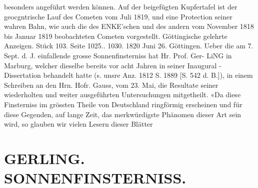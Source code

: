 \documentclass[12pt,a4paper]{article}
\begin{document}
{{{{{{{{besonders  angeführt  werden  können.  Auf  der  beigefügten  Kupfertafel  ist  der  geocgntrische  Lauf des  Cometen  vom  Juli  1819,  und  eine  Protection  seiner  wahren  Bahn,  wie  auch  die  des  ENKE'schen  und des  andern  vom  November  1818  bis  Januar  1819  beobachteten  Cometen  vorgestellt. Göttingische  gelehrte  Anzeigen.     Stück  103.     Seite  1025..  1030.     1820  Juni  26. Göttingen.  Ueber  die  am  7.  Sept.  d.  J.  einfallende  grosse  Sonnenfinsterniss  hat  Hr.  Prof.  Ger- LiNG  in  Marburg,  welcher  dieselbe  bereits  vor  acht  Jahren  in  seiner  Inaugural  -  Dissertation  behandelt hatte  (s.  unsre  Anz.  1812  S.  1889  [S.  542  d.  B.]),  in  einem  Schreiben  an  den  Hrn.  Hofr.  Gauss,  vom  23. Mai,  die  Resultate  seiner  wiederholten  und  weiter  ausgeführten  Untersuchungen  mitgetheilt.  «Da  diese Finsterniss  im  grössten  Theile  von  Deutschland  ringförmig  erscheinen  und  für  diese  Gegenden,  auf  lange Zeit,  das  merkwürdigste  Phänomen  dieser  Art  sein  wird,    so  glauben  wir    vielen  Lesern    dieser  Blätter


\section*{GERLING.     SONNENFINSTERNISS.}

}}}}}}}}
\end{document}

